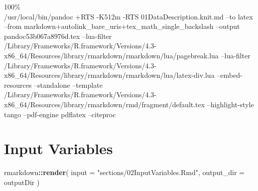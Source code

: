 \documentclass[
]{article}
\newenvironment{Shaded}{\begin{snugshade}}{\end{snugshade}}
\newcommand{\AttributeTok}[1]{\textcolor[rgb]{0.13,0.29,0.53}{#1}}
\newcommand{\FunctionTok}[1]{\textcolor[rgb]{0.13,0.29,0.53}{\textbf{#1}}}
\newcommand{\NormalTok}[1]{#1}
\newcommand{\SpecialCharTok}[1]{\textcolor[rgb]{0.81,0.36,0.00}{\textbf{#1}}}
\newcommand{\StringTok}[1]{\textcolor[rgb]{0.31,0.60,0.02}{#1}}
\begin{document}
100\%\\
/usr/local/bin/pandoc +RTS -K512m -RTS 01DataDescription.knit.md --to
latex --from markdown+autolink\_bare\_uris+tex\_math\_single\_backslash
--output pandoc53b067a8976d.tex --lua-filter
/Library/Frameworks/R.framework/Versions/4.3-x86\_64/Resources/library/rmarkdown/rmarkdown/lua/pagebreak.lua
--lua-filter
/Library/Frameworks/R.framework/Versions/4.3-x86\_64/Resources/library/rmarkdown/rmarkdown/lua/latex-div.lua
--embed-resources --standalone --template
/Library/Frameworks/R.framework/Versions/4.3-x86\_64/Resources/library/rmarkdown/rmd/fragment/default.tex
--highlight-style tango --pdf-engine pdflatex --citeproc

\hypertarget{input-variables}{%
\section{Input Variables}\label{input-variables}}

\begin{Shaded}
\begin{Highlighting}[]
\NormalTok{rmarkdown}\SpecialCharTok{::}\FunctionTok{render}\NormalTok{(}
  \AttributeTok{input =} \StringTok{"sections/02InputVariables.Rmd"}\NormalTok{,}
  \AttributeTok{output\_dir =}\NormalTok{ outputDir}
\NormalTok{)}
\end{Highlighting}
\end{Shaded}
\end{document}
